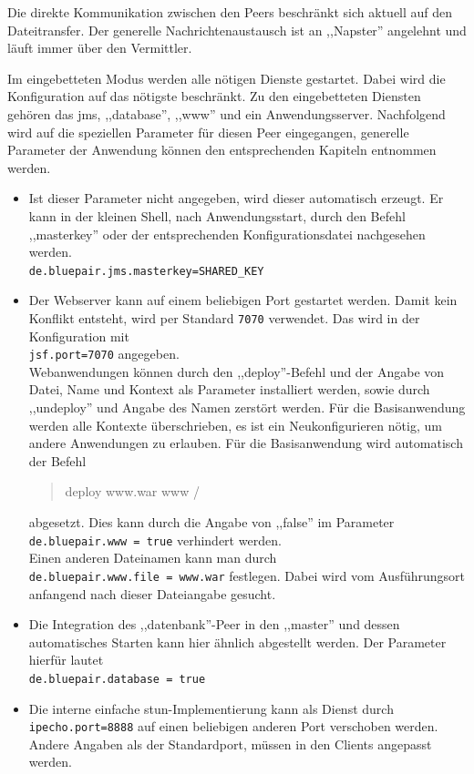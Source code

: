 \documentclass[oneside, ngerman, toc=bibliography,bibliography=totoc,listof=entryprefix, open=right,numbers=noenddot,fontsize=12pt]{scrbook}
\begin{document}
Die direkte Kommunikation zwischen den Peers beschränkt sich aktuell auf den Dateitransfer. Der generelle Nachrichtenaustausch ist an ,,Napster'' angelehnt und läuft immer über den Vermittler.


Im eingebetteten Modus werden alle nötigen Dienste gestartet. Dabei wird die Konfiguration auf das nötigste beschränkt. Zu den eingebetteten Diensten gehören das \acrshort{jms}, ,,database'', ,,www'' und ein Anwendungsserver. Nachfolgend wird auf die speziellen Parameter für diesen Peer eingegangen, generelle Parameter der Anwendung können den entsprechenden Kapiteln entnommen werden.

\begin{itemize}
    
    \item 
    Ist dieser Parameter nicht angegeben, wird dieser automatisch erzeugt. Er kann in der kleinen Shell, nach Anwendungsstart, durch den Befehl ,,masterkey'' oder der entsprechenden Konfigurationsdatei nachgesehen werden.\\
    \verb|de.bluepair.jms.masterkey=SHARED_KEY|
    \item Der Webserver kann auf einem beliebigen Port gestartet werden. Damit kein Konflikt entsteht, wird per Standard \verb|7070| verwendet. Das wird in der Konfiguration mit \\
    \verb|jsf.port=7070| angegeben. \\
    Webanwendungen können durch den ,,deploy''-Befehl und der Angabe von Datei, Name und Kontext als Parameter installiert werden, sowie durch ,,undeploy'' und Angabe des Namen zerstört werden.
    Für die Basisanwendung werden alle Kontexte überschrieben, es ist ein Neukonfigurieren nötig, um andere Anwendungen zu erlauben. Für die Basisanwendung wird automatisch der Befehl\\
    \begin{quote}
        deploy www.war www /
    \end{quote}
     abgesetzt. Dies kann durch die Angabe von ,,false'' im Parameter\\
     \verb|de.bluepair.www = true| verhindert werden.\\ Einen anderen Dateinamen kann man durch \\
     \verb|de.bluepair.www.file = www.war| festlegen. Dabei wird vom Ausführungsort anfangend nach dieser Dateiangabe gesucht.
     
     \item Die Integration des ,,datenbank''-Peer in den ,,master'' und dessen automatisches Starten kann hier ähnlich abgestellt werden. Der Parameter hierfür lautet \\
     \verb|de.bluepair.database = true|
     
     
     \item Die interne einfache \acrshort{stun}-Implementierung kann als Dienst durch \\
     \verb|ipecho.port=8888| auf einen beliebigen anderen Port verschoben werden. Andere Angaben als der Standardport, müssen in den Clients angepasst werden.
      
     
    
\end{itemize}
\end{document}
